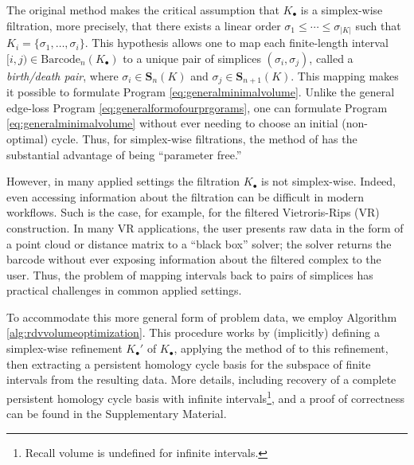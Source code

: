 \documentclass[utf8]{formatting_stuff/frontiersFPHY}
\newcommand{\Simplices}[0]{\mathbf{S}}
\newcommand{\barcode}{\mathrm{Barcode}}
\newcommand{\simplex}{\sigma}
\theoremstyle{plain}
\theoremstyle{definition}
\begin{document}
The original method makes the critical assumption that $K_\bullet$ is a simplex-wise filtration, more precisely, that there exists a linear order $\sigma_1 \le \cdots \le \sigma_{|K|}$ such that $K_i = \{\simplex_1, \ldots, \simplex_i\}$. This hypothesis allows one to map each finite-length interval $[i,j) \in \barcode_n(K_\bullet)$ to a unique pair of simplices $(\simplex_i, \simplex_j)$, called a \emph{birth/death pair}, where  $\sigma_i \in \Simplices_n(K)$ and $\sigma_j \in \Simplices_{n+1}(K)$.    This mapping makes it possible to formulate Program \eqref{eq:generalminimalvolume}. Unlike the general edge-loss Program \eqref{eq:generalformofourprgorams}, one can formulate Program \eqref{eq:generalminimalvolume} without ever needing to choose an initial (non-optimal) cycle.  Thus, for simplex-wise filtrations, the method of \cite{Obayashi2018} has the substantial advantage of being ``parameter free.''

 
However, in many applied settings the filtration $K_\bullet$ is not simplex-wise.   Indeed, even accessing information about the filtration can be difficult in modern workflows.  Such is the case, for example, for the filtered Vietroris-Rips (VR) construction. In many VR applications, the user  presents raw data in the form of a point cloud or distance matrix to a ``black box'' solver; the solver returns the barcode without ever exposing information about the filtered complex to the user. Thus, the problem of mapping intervals back to pairs of simplices has practical challenges in common applied settings.




 
To accommodate this more general form of problem data, we employ Algorithm \ref{alg:rdvvolumeoptimization}.  This procedure works by (implicitly) defining a simplex-wise refinement $K_\bullet'$ of $K_\bullet$, applying the method of \cite{Obayashi2018} to this refinement, then extracting a persistent homology cycle basis for the subspace of finite intervals from the resulting data.
 More details, including recovery of a complete persistent homology cycle basis with infinite intervals\footnote{Recall volume is undefined for infinite intervals.}, and a proof of correctness can be found in the Supplementary Material.
\end{document}

